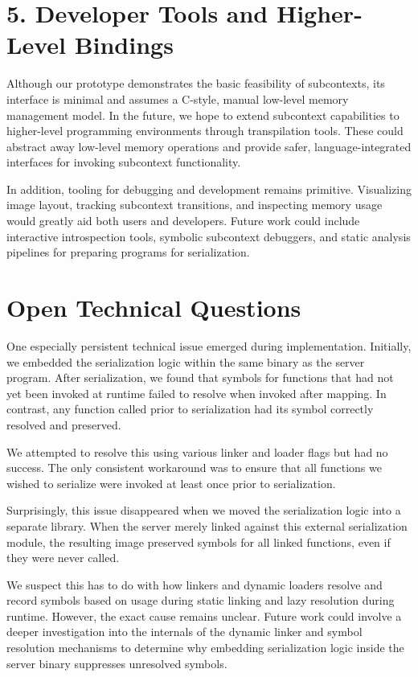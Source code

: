 \section*{5. Developer Tools and Higher-Level Bindings}
Although our prototype demonstrates the basic feasibility of subcontexts, its interface is minimal and assumes a C-style, manual low-level memory management model. In the future, we hope to extend subcontext capabilities to higher-level programming environments through transpilation tools. These could abstract away low-level memory operations and provide safer, language-integrated interfaces for invoking subcontext functionality.

In addition, tooling for debugging and development remains primitive. Visualizing image layout, tracking subcontext transitions, and inspecting memory usage would greatly aid both users and developers. Future work could include interactive introspection tools, symbolic subcontext debuggers, and static analysis pipelines for preparing programs for serialization.

\section*{Open Technical Questions}
One especially persistent technical issue emerged during implementation. Initially, we embedded the serialization logic within the same binary as the server program. After serialization, we found that symbols for functions that had not yet been invoked at runtime failed to resolve when invoked after mapping. In contrast, any function called prior to serialization had its symbol correctly resolved and preserved.

We attempted to resolve this using various linker and loader flags but had no success. The only consistent workaround was to ensure that all functions we wished to serialize were invoked at least once prior to serialization.

Surprisingly, this issue disappeared when we moved the serialization logic into a separate library. When the server merely linked against this external serialization module, the resulting image preserved symbols for all linked functions, even if they were never called.

We suspect this has to do with how linkers and dynamic loaders resolve and record symbols based on usage during static linking and lazy resolution during runtime. However, the exact cause remains unclear. Future work could involve a deeper investigation into the internals of the dynamic linker and symbol resolution mechanisms to determine why embedding serialization logic inside the server binary suppresses unresolved symbols.